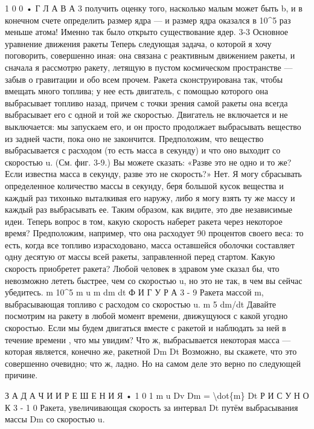 \documentclass[10pt,oneside]{article}
\begin{document}
1 0 0 • Г Л А В А  3 получить оценку того, насколько малым может быть b, и в конечном счете определить размер ядра --- и размер ядра оказался в 10\textasciicircum{}5 раз меньше атома! Именно так было открыто существование ядер. 3-3 Основное уравнение движения ракеты Теперь следующая задача, о которой я хочу поговорить, совершенно иная: она связана с реактивным движением ракеты, и сначала я рассмотрю ракету, летящую в пустом космическом пространстве --- забыв о гравитации и обо всем прочем. Ракета сконструирована так, чтобы вмещать много топлива; у нее есть двигатель, с помощью которого она выбрасывает топливо назад, причем с точки зрения самой ракеты она всегда выбрасывает его с одной и той же скоростью. Двигатель не включается и не выключается: мы запускаем его, и он просто продолжает выбрасывать вещество из задней части, пока оно не закончится. Предположим, что вещество выбрасывается с расходом (то есть масса в секунду) и что оно выходит со скоростью u. (См. фиг. 3-9.) Вы можете сказать: «Разве это не одно и то же? Если известна масса в секунду, разве это не скорость?» Нет. Я могу сбрасывать определенное количество массы в секунду, беря большой кусок вещества и каждый раз тихонько выталкивая его наружу, либо я могу взять ту же массу и каждый раз выбрасывать ее. Таким образом, как видите, это две независимые идеи. Теперь вопрос в том, какую скорость наберет ракета через некоторое время? Предположим, например, что она расходует 90 процентов своего веса: то есть, когда все топливо израсходовано, масса оставшейся оболочки составляет одну десятую от массы всей ракеты, заправленной перед стартом. Какую скорость приобретет ракета? Любой человек в здравом уме сказал бы, что невозможно лететь быстрее, чем со скоростью u, но это не так, в чем вы сейчас убедитесь. m 10\textasciicircum{}5 m u m   dm dt Ф И Г У Р А 3 - 9 Ракета массой m, выбрасывающая топливо с расходом со скоростью u. m 5 dm/dt Давайте посмотрим на ракету в любой момент времени, движущуюся с какой угодно скоростью. Если мы будем двигаться вместе с ракетой и наблюдать за ней в течение времени , что мы увидим? Что ж, выбрасывается некоторая масса --- которая является, конечно же, ракетной Dm Dt Возможно, вы скажете, что это совершенно очевидно; что ж, ладно. Но на самом деле это верно по следующей причине.\par

З А Д А Ч И  И  Р Е Ш Е Н И Я • 1 0 1 m u Dv Dm = \textbackslash{}dot\{m\} Dt Р И С У Н О К  3 - 1 0 Ракета, увеличивающая скорость за интервал Dt путём выбрасывания массы Dm со скоростью u.\par
\end{document}
